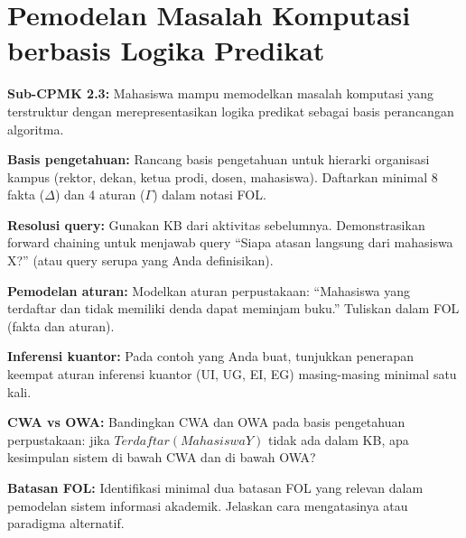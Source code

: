 \documentclass[../main]{subfiles}
\begin{document}
\chapter{Pemodelan Masalah Komputasi berbasis Logika Predikat}

\begin{subcpmk}
  \item \textbf{Sub-CPMK 2.3:} Mahasiswa mampu memodelkan masalah komputasi yang terstruktur dengan merepresentasikan logika predikat sebagai basis perancangan algoritma.
\end{subcpmk}










\begin{aktivitas}
  \item \textbf{Basis pengetahuan:} Rancang basis pengetahuan untuk hierarki organisasi kampus (rektor, dekan, ketua prodi, dosen, mahasiswa). Daftarkan minimal 8 fakta ($\Delta$) dan 4 aturan ($\Gamma$) dalam notasi FOL.
  \item \textbf{Resolusi query:} Gunakan KB dari aktivitas sebelumnya. Demonstrasikan forward chaining untuk menjawab query ``Siapa atasan langsung dari mahasiswa X?'' (atau query serupa yang Anda definisikan).
  \item \textbf{Pemodelan aturan:} Modelkan aturan perpustakaan: ``Mahasiswa yang terdaftar dan tidak memiliki denda dapat meminjam buku.'' Tuliskan dalam FOL (fakta dan aturan).
  \item \textbf{Inferensi kuantor:} Pada contoh yang Anda buat, tunjukkan penerapan keempat aturan inferensi kuantor (UI, UG, EI, EG) masing-masing minimal satu kali.
  \item \textbf{CWA vs OWA:} Bandingkan CWA dan OWA pada basis pengetahuan perpustakaan: jika $Terdaftar(MahasiswaY)$ tidak ada dalam KB, apa kesimpulan sistem di bawah CWA dan di bawah OWA?
  \item \textbf{Batasan FOL:} Identifikasi minimal dua batasan FOL yang relevan dalam pemodelan sistem informasi akademik. Jelaskan cara mengatasinya atau paradigma alternatif.
\end{aktivitas}
\end{document}
